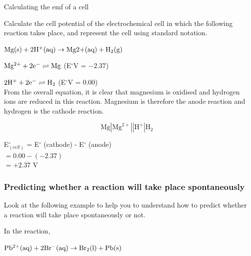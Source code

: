 \begin{wex}{Calculating the emf of a cell}{Calculate the cell potential of the electrochemical cell in which the following reaction takes place, and represent the cell using standard notation.

\begin{center}
$\rm{Mg(s) + 2H^{+}(aq) \rightarrow Mg{2+}(aq) + H_{2}(g)}$
\end{center}
}

{
$\rm{Mg^{2+} + 2e^{-} \rightleftharpoons Mg}$ (E$^{\circ}$V = $-2.37$)

$\rm{2H^{+} + 2e^{-} \rightleftharpoons H_{2}}$ (E$^{\circ}$V = 0.00)\\

From the overall equation, it is clear that magnesium is oxidised and hydrogen ions are reduced in this reaction. Magnesium is therefore the anode reaction and hydrogen is the cathode reaction.

\begin{equation*}
\text{Mg}|\text{Mg}^{2+}||\text{H}^{+}|\text{H}_{2}
\end{equation*}

E$^{\circ}_{(cell)}$ = E$^{\circ}$ (cathode) - E$^{\circ}$ (anode)\\

$= 0.00 - (-2.37)$\\

$= +2.37$ V
}
\end{wex}

\subsubsection{Predicting whether a reaction will take place spontaneously}

Look at the following example to help you to understand how to predict whether a reaction will take place spontaneously or not.

In the reaction,

\begin{center}
$\rm{Pb^{2+}(aq) + 2Br^{-}(aq) \rightarrow Br_{2}(l) + Pb(s)}$
\end{center}

